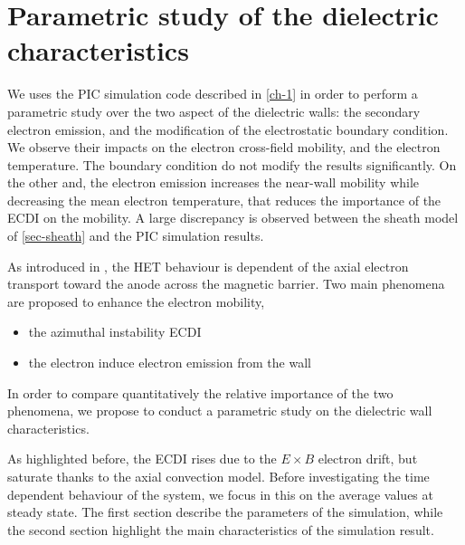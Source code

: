 



\chapter{Parametric study of the dielectric characteristics}
\label{ch-2}

We uses the PIC simulation code described in \cref{ch-1} in order to perform a parametric study over the two aspect of the dielectric walls: the secondary electron emission, and the modification of the electrostatic boundary condition.
We observe their impacts on the electron cross-field mobility, and the electron temperature.
The boundary condition do not modify the results significantly.
On the other and, the electron emission increases the near-wall mobility while decreasing the mean electron temperature, that reduces the importance of the \ac{ECDI} on the mobility.
A large discrepancy is observed between the sheath model of \cref{sec-sheath} and the PIC simulation results.

\minitoc


% 
% 
% 
% 
% 
% 
% 

As introduced in , the \ac{HET} behaviour is dependent of the axial electron transport toward the anode across the magnetic barrier.
Two main phenomena are proposed to enhance the electron mobility,
\begin{itemize}
  \item the azimuthal instability \ac{ECDI}
  \item the electron induce electron emission from the wall
\end{itemize}
In order to compare quantitatively the relative importance of the two phenomena, we propose to conduct a parametric study on the dielectric wall characteristics.

As highlighted before, the \ac{ECDI} rises due to the $E \times B$ electron drift, but saturate thanks to the axial convection model.
Before investigating the time dependent behaviour of the system, we focus in this  on the average values at steady state.
The first section describe the parameters of the simulation, 
while the second section highlight the main characteristics of the simulation result.









